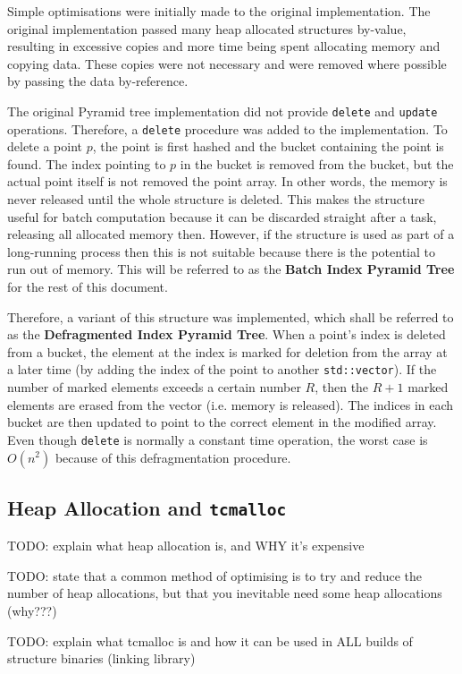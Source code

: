 Simple optimisations were initially made to the original implementation. The original implementation passed many heap allocated structures by-value, resulting in excessive copies and more time being spent allocating memory and copying data. These copies were not necessary and were removed where possible by passing the data by-reference.

The original Pyramid tree implementation did not provide \texttt{delete} and \texttt{update} operations. Therefore, a \texttt{delete} procedure was added to the implementation. To delete a point $p$, the point is first hashed and the bucket containing the point is found. The index pointing to $p$ in the bucket is removed from the bucket, but the actual point itself is not removed the point array. In other words, the memory is never released until the whole structure is deleted. This makes the structure useful for batch computation because it can be discarded straight after a task, releasing all allocated memory then. However, if the structure is used as part of a long-running process then this is not suitable because there is the potential to run out of memory. This will be referred to as the \textbf{Batch Index Pyramid Tree} for the rest of this document.

Therefore, a variant of this structure was implemented, which shall be referred to as the \textbf{Defragmented Index Pyramid Tree}. When a point's index is deleted from a bucket, the element at the index is marked for deletion from the array at a later time (by adding the index of the point to another \texttt{std::vector}). If the number of marked elements exceeds a certain number $R$, then the $R + 1$ marked elements are erased from the vector (i.e. memory is released). The indices in each bucket are then updated to point to the correct element in the modified array. Even though \texttt{delete} is normally a constant time operation, the worst case is $O(n^2)$ because of this defragmentation procedure.

\subsection{Heap Allocation and \texttt{tcmalloc}}

TODO: explain what heap allocation is, and WHY it's expensive

TODO: state that a common method of optimising is to try and reduce the number of heap allocations, but that you inevitable need some heap allocations (why???)

TODO: explain what tcmalloc is and how it can be used in ALL builds of structure binaries (linking library)

